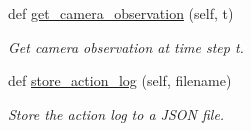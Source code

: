 \begin{DoxyCompactItemize}
def \hyperlink{classtrifinger__simulation_1_1trifinger__platform_1_1TriFingerPlatform_a805e6e931f01283be195d04a7138a3f4}{get\+\_\+camera\+\_\+observation} (self, t)
\begin{DoxyCompactList}\small\item\em Get camera observation at time step t. \end{DoxyCompactList}\item 
def \hyperlink{classtrifinger__simulation_1_1trifinger__platform_1_1TriFingerPlatform_a2f504c8f4c9681359440a0a33d25c0f4}{store\+\_\+action\+\_\+log} (self, filename)
\begin{DoxyCompactList}\small\item\em Store the action log to a J\+S\+ON file. \end{DoxyCompactList}\end{DoxyCompactItemize}
